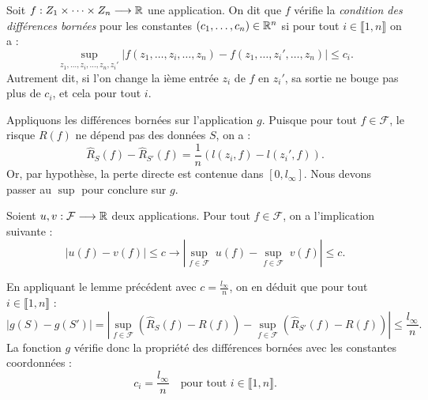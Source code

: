 \begin{definition}
    Soit $ f : Z_1 \times \dots \times Z_n \longrightarrow \mathbb{R}$ une application. On dit que $f$ vérifie la \emph{condition des différences bornées} pour les constantes $(c_1, \dots, c_n) \in \mathbb{R}^n$ si pour tout $ i \in \llbracket 1, n \rrbracket$ on a : 
    \begin{equation}
        \underset{z_1, \dots, z_i, \dots, z_n, z_i'}{\sup} \left| f(z_1, \dots, z_i, \dots, z_n) - f(z_1, \dots, z_i', \dots, z_n)\right| \leqslant c_i. 
    \end{equation}
    Autrement dit, si l'on change la ième entrée $z_i$ de $f$ en $z_i'$, sa sortie ne bouge pas plus de $c_i$, et cela pour tout $i$. 
\end{definition}

\begin{proposition}
    Appliquons les différences bornées sur l'application $g$. Puisque pour tout $f \in \mathcal{F}$, le risque $R(f)$ ne dépend pas des données $S$, on a : 
    \begin{equation}
        \hat{R}_S(f) - \hat{R}_{S'}(f) = \frac{1}{n} \left( l(z_i, f) - l(z_i', f)\right). 
    \end{equation}
    Or, par hypothèse, la perte directe est contenue dans $[0, l_\infty]$. Nous devons passer au $\sup$ pour conclure sur $g$. 
\end{proposition}

\begin{lemma}
    Soient $u, v : \mathcal{F} \longrightarrow \mathbb{R}$ deux applications. Pour tout $f \in \mathcal{F}$, on a l'implication suivante : 
    \begin{equation}
        \left| u(f) - v(f)\right| \leqslant c \longrightarrow \left| \underset{f \in \mathcal{F}}{\sup} \; u(f) - \underset{f \in \mathcal{F}}{\sup} \; v(f)\right| \leqslant c. 
    \end{equation}
\end{lemma}

En appliquant le lemme précédent avec $c = \frac{l_\infty}{n}$, on en déduit que pour tout $i \in \llbracket 1, n \rrbracket$ : 
\begin{equation}
        |g(S) - g(S')| = \left| \sup_{f \in \mathcal{F}} (\hat{R}_S(f) - R(f)) - \sup_{f \in \mathcal{F}} (\hat{R}_{S'}(f) - R(f)) \right| \leqslant \frac{l_\infty}{n}.
    \end{equation}
    La fonction $g$ vérifie donc la propriété des différences bornées avec les constantes coordonnées :
    \begin{equation}
        c_i = \frac{l_\infty}{n} \quad \text{pour tout } i \in \llbracket 1, n \rrbracket.
    \end{equation}

